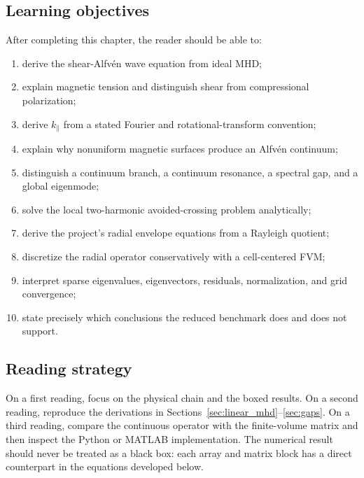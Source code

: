 \subsection{Learning objectives}
After completing this chapter, the reader should be able to:
\begin{enumerate}[leftmargin=1.6em]
\item derive the shear-Alfv\'en wave equation from ideal MHD;
\item explain magnetic tension and distinguish shear from compressional polarization;
\item derive $k_\parallel$ from a stated Fourier and rotational-transform convention;
\item explain why nonuniform magnetic surfaces produce an Alfv\'en continuum;
\item distinguish a continuum branch, a continuum resonance, a spectral gap, and a global eigenmode;
\item solve the local two-harmonic avoided-crossing problem analytically;
\item derive the project's radial envelope equations from a Rayleigh quotient;
\item discretize the radial operator conservatively with a cell-centered FVM;
\item interpret sparse eigenvalues, eigenvectors, residuals, normalization, and grid convergence;
\item state precisely which conclusions the reduced benchmark does and does not support.
\end{enumerate}

\subsection{Reading strategy}
On a first reading, focus on the physical chain and the boxed results. On a second reading, reproduce the derivations in Sections~\ref{sec:linear_mhd}--\ref{sec:gaps}. On a third reading, compare the continuous operator with the finite-volume matrix and then inspect the Python or MATLAB implementation. The numerical result should never be treated as a black box: each array and matrix block has a direct counterpart in the equations developed below.
